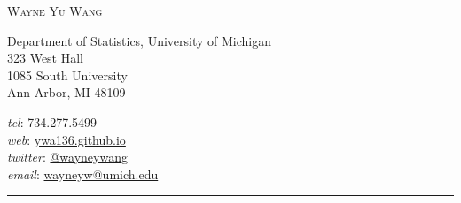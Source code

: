 \documentclass[11pt]{article}
\makeatletter
\newcommand{\myname}{Wayne Yu Wang}     %
\newcommand{\websiteurl}{{https://ywa136.github.io}} %
\newcommand{\websitename}{ywa136.github.io}       %
\newcommand{\phone}{734.277.5499}       %
\newcommand{\email}{wayneyw@umich.edu}  %
\newcommand{\twitterurl}{{https://twitter.com/wayneywang}}  %
\newcommand{\twitterhandle}{@wayneywang}      %
\newcommand{\address}{                  %
  Department of Statistics, University of Michigan \\
  323 West Hall \\
  1085 South University \\    
  Ann Arbor, MI 48109                   
}
\makeatother
\begin{document}
\thispagestyle{first}


%

\hspace*{-\parindent}%
\begin{center}
  \vspace{-2em}
  {\LARGE\scshape \myname} \\
\end{center}
\begin{minipage}[t]{.6\linewidth}
\address
\end{minipage}
\hspace*{-\parindent}%
\begin{minipage}[t]{.43\linewidth}
\begin{flushright}
  \textit{tel}: \phone \\
  \textit{web}: \href{\websiteurl}{\websitename} \\
  \textit{twitter}: \href{\twitterurl}{\twitterhandle} \\
  \textit{email}: \href{mailto:\email}{\email}
\end{flushright}
\end{minipage}
\begin{center}
  \vspace{-.5em}
  \rule{\textwidth}{1pt}  
\end{center}



\end{document}
